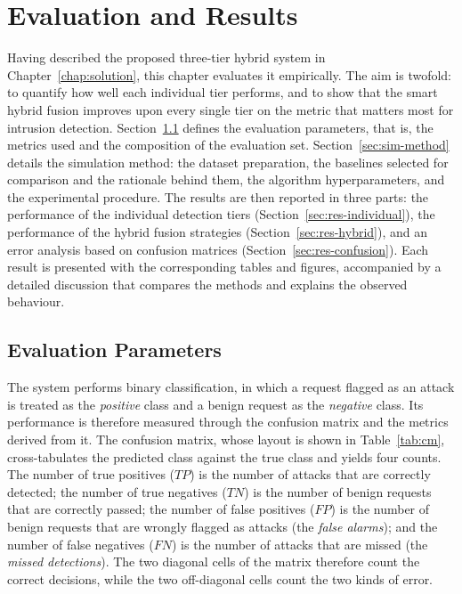 \documentclass[12pt,a4paper]{report}
\begin{document}

\chapter{Evaluation and Results}
\label{chap:evaluation}

Having described the proposed three-tier hybrid system in
Chapter~\ref{chap:solution}, this chapter evaluates it empirically. The aim
is twofold: to quantify how well each individual tier performs, and to show
that the smart hybrid fusion improves upon every single tier on the metric
that matters most for intrusion detection. Section~\ref{sec:eval-params}
defines the evaluation parameters, that is, the metrics used and the
composition of the evaluation set. Section~\ref{sec:sim-method} details the
simulation method: the dataset preparation, the baselines selected for
comparison and the rationale behind them, the algorithm hyperparameters, and
the experimental procedure. The results are then reported in three parts:
the performance of the individual detection tiers
(Section~\ref{sec:res-individual}), the performance of the hybrid fusion
strategies (Section~\ref{sec:res-hybrid}), and an error analysis based on
confusion matrices (Section~\ref{sec:res-confusion}). Each result is
presented with the corresponding tables and figures, accompanied by a
detailed discussion that compares the methods and explains the observed
behaviour.

\section{Evaluation Parameters}
\label{sec:eval-params}

The system performs binary classification, in which a request flagged as an
attack is treated as the \emph{positive} class and a benign request as the
\emph{negative} class. Its performance is therefore measured through the
confusion matrix and the metrics derived from it. The confusion matrix, whose
layout is shown in Table~\ref{tab:cm}, cross-tabulates the predicted class
against the true class and yields four counts. The number of true positives
($TP$) is the number of attacks that are correctly detected; the number of
true negatives ($TN$) is the number of benign requests that are correctly
passed; the number of false positives ($FP$) is the number of benign requests
that are wrongly flagged as attacks (the \emph{false alarms}); and the number
of false negatives ($FN$) is the number of attacks that are missed (the
\emph{missed detections}). The two diagonal cells of the matrix therefore
count the correct decisions, while the two off-diagonal cells count the two
kinds of error.
\end{document}
